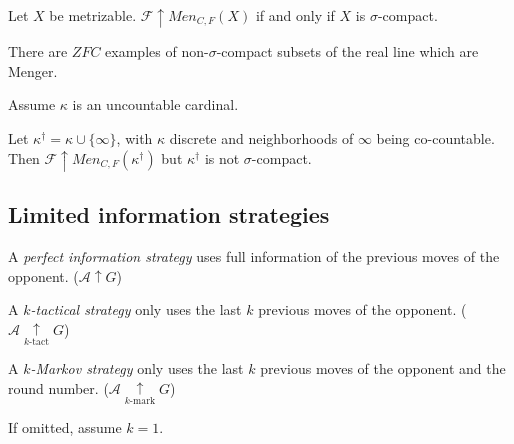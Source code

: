 \documentclass{beamer}
\theoremstyle{definition}
\newcommand{\win}{\uparrow}
\newcommand{\kmarkwin}[1]{\underset{#1\text{-mark}}{\uparrow}}
\newcommand{\ktactwin}[1]{\underset{#1\text{-tact}}{\uparrow}}
\newcommand{\oneptlind}[1]{#1^\dagger} %
\newcommand{\menGame}[1]{Men_{C,F}\left({#1}\right)}
\newcommand{\<}{\langle}
\renewcommand{\>}{\rangle}
\newcommand{\pl}[1]{\mathscr{#1}}
\newcommand{\term}{\textit}
\begin{document}
\begin{frame}

  \begin{theorem}
    Let \(X\) be metrizable. \(\pl F\win\menGame X\) if and only if \(X\) is
    \(\sigma\)-compact.
  \end{theorem}

  \pause

  \begin{theorem}
    There are \(ZFC\) examples of non-\(\sigma\)-compact
    subsets of the real line which are Menger.
  \end{theorem}

  \pause

  Assume \(\kappa\) is an uncountable cardinal.

  \begin{example}
    Let \(\oneptlind\kappa=\kappa\cup\{\infty\}\), with \(\kappa\)
    discrete and neighborhoods of \(\infty\) being co-countable.
    Then \(\pl F\win\menGame{\oneptlind\kappa}\) but \(\oneptlind\kappa\)
    is not \(\sigma\)-compact.
  \end{example}

\end{frame}

\subsection{Limited information strategies}

\begin{frame}

  \begin{definition}
    A \term{perfect information strategy} uses full information of the
    previous moves of the opponent. (\(\pl A\win G\))
  \end{definition}

  \pause

  \begin{definition}
    A \term{$k$-tactical strategy} only uses the last \(k\)
    previous moves of the opponent. (\(\pl A\ktactwin{k} G\))
  \end{definition}

  \pause

  \begin{definition}
    A \term{$k$-Markov strategy} only uses the last \(k\)
    previous moves of the opponent and the round number.
    (\(\pl A\kmarkwin{k} G\))
  \end{definition}

  \pause

  If omitted, assume \(k=1\).

\end{frame}
\end{document}
